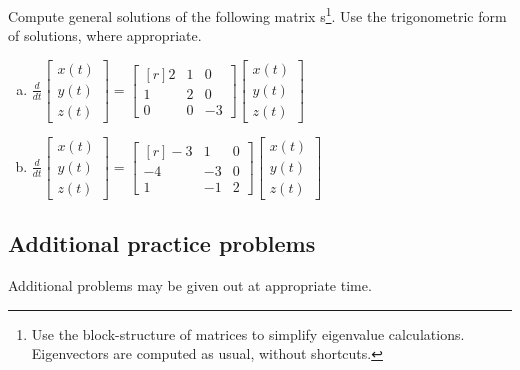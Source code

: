 \begin{question}
  Compute general solutions of the following matrix \ode{}s\footnote{Use the block-structure of matrices to simplify eigenvalue calculations. Eigenvectors are computed as usual, without shortcuts.}. Use the trigonometric form of solutions, where appropriate.
  \begin{enumerate}[(a)]
  \item \(
    \frac{d}{dt}
    \begin{bmatrix*}
      x(t) \\ y(t) \\ z(t)
    \end{bmatrix*} =
    \begin{bmatrix*}[r]
      2 & 1 & 0\\ 1 & 2 & 0 \\ 0 & 0 & -3
    \end{bmatrix*}
    \begin{bmatrix*}
      x(t) \\ y(t) \\ z(t)
    \end{bmatrix*}
    \)
    \solspace{4in}

  \newpage\item \(
    \frac{d}{dt}
    \begin{bmatrix*}
      x(t) \\ y(t) \\ z(t)
    \end{bmatrix*} =
    \begin{bmatrix*}[r]
      -3 & 1 & 0\\ -4 & -3 & 0 \\ 1 & -1 & 2
    \end{bmatrix*}
    \begin{bmatrix*}
      x(t) \\ y(t) \\ z(t)
    \end{bmatrix*}
    \)
    \solspace{4in}
  \end{enumerate}
\end{question}


\subsection*{Additional practice problems}

Additional problems may be given out at appropriate time.
